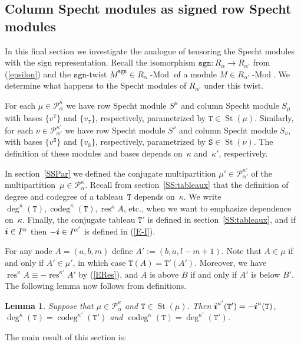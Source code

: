 \documentclass[twoside,11pt,reqno]{amsart}
\numberwithin{equation}{section}
\newtheorem{Lemma}[equation]{Lemma}
\theoremstyle{definition}  %
\newcommand\Comment[2][\relax]{\space\par\medskip\noindent%
   \fbox{\begin{minipage}{\textwidth}\textbf{Comment\ifx\relax#1\else---#1\fi}\newline%
        #2\end{minipage}}\medskip
}
\def\bi{\text{\boldmath$i$}}
\def\sgn{\mathtt{sgn}}
\newcommand{\res}{\operatorname{res}}
\newcommand{\St}{\operatorname{St}}
\newcommand{\Stab}{\operatorname{Stab}}
\newcommand{\0}{{\bar 0}}
\newcommand{\1}{{\bar 1}}
\newcommand{\al}{\alpha}
\newcommand\Par[1][]{{\mathscr P}^{\kappa#1}}
\def\T{{\mathtt T}}
\def\Stab{{\mathtt S}}
\def\codeg{\operatorname{codeg}}
\def\Mod#1{#1\!\operatorname{-Mod}}
\begin{document}
\subsection{Column Specht modules as signed row Specht modules}\label{SSSign}
In this final section we investigate the analogue of tensoring the Specht modules with the sign representation.
Recall the isomorphism $\sgn:R_\al\to R_{\alpha'}$ from (\ref{epsilon}) 
and the $\sgn$-twist $M^\sgn\in \Mod{R_\al}$ of a module $M\in \Mod{R_{\al'}}$. 
We determine what happens to the Specht modules of $R_{\al'}$ under this twist. 

For each $\mu\in\Par_\al$ we have row Specht module $S^\mu$ and column  Specht module $S_\mu$ with
bases $\{v^\T\}$ and $\{v_\T\}$, respectively, parametrized by $\T\in\St(\mu)$. Similarly, for
each $\nu\in\Par[']_{\al'}$ we have row Specht module $S^\nu$ and column Specht module $S_\nu$,
with bases $\{v^\Stab\}$ and $\{v_\Stab\}$, respectively, parametrized by $\Stab\in\St(\nu)$.
The definition of these modules and bases depends on~$\kappa$
and~$\kappa'$, respectively. 

In section~\ref{SSPar} we defined the conjugate multipartition $\mu'\in\Par[']_{\al'}$ of the multipartition~$\mu\in\Par_\al$. Recall from section~\ref{SS:tableaux} that the
definition of degree and codegree of a tableau~$\T$ depends on~$\kappa$. We
write $\deg^\kappa(\T), \codeg^\kappa(\T), \res^\kappa A$, etc., when we want to emphasize dependence on~$\kappa$. Finally, the conjugate tableau $\T'$ is defined in section~\ref{SS:tableaux}, and if $\bi\in I^\al$ then $-\bi\in I^{\al'}$ is defined in (\ref{E-I}). 

For any node $A=(a,b,m)$ define $A':=(b,a,l-m+1)$. 
Note that $A\in\mu$ if and only if $A'\in \mu'$, in which case $\T(A)=\T'(A')$. Moreover, we have $\res^\kappa A\equiv -\res^{\kappa'}A'$ 
  by (\ref{ERes}), and $A$ is above $B$ if and only if $A'$ is below $B'$. The following lemma now follows from definitions. 

\begin{Lemma}\label{L:signs}
  Suppose that $\mu\in\Par_\al$ and $\T\in\St(\mu)$. Then $\bi^{\kappa'}(\T')=-\bi^\kappa(\T)$, $\deg^\kappa(\T)=\codeg^{\kappa'}(\T')$ and
  $\codeg^\kappa(\T)=\deg^{\kappa'}(\T')$.
\end{Lemma}


The main result of this section is:
\end{document}
